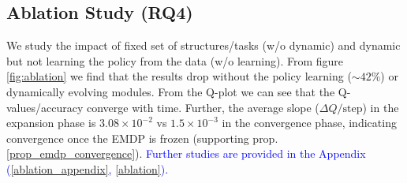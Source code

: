 \subsection{Ablation Study (RQ4)}
We study the impact of fixed set of structures/tasks (w/o dynamic) and dynamic but not learning the policy from the data (w/o learning). 
From figure \ref{fig:ablation} we find that the results drop without the policy learning ($\sim 42 \%$) or dynamically evolving modules. 
From the Q-plot we can see that the Q-values/accuracy converge with time. Further, the average slope ($\Delta Q/\text{step}$) in the expansion phase is $3.08\times10^{-2}$ vs $1.5\times10^{-3}$ in the convergence phase, indicating convergence once the EMDP is frozen (supporting prop. \ref{prop_emdp_convergence}).
\textcolor{blue}{Further studies are provided in the Appendix (\ref{ablation_appendix}, \ref{ablation}).}

